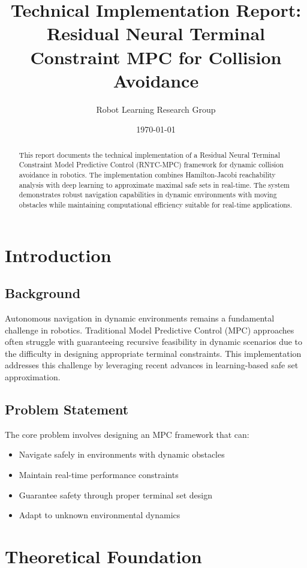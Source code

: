 \documentclass[12pt,a4paper]{article}
\title{Technical Implementation Report: \\ Residual Neural Terminal Constraint MPC for Collision Avoidance}
\author{Robot Learning Research Group}
\date{\today}
\begin{document}
\maketitle

\begin{abstract}
This report documents the technical implementation of a Residual Neural Terminal Constraint Model Predictive Control (RNTC-MPC) framework for dynamic collision avoidance in robotics. The implementation combines Hamilton-Jacobi reachability analysis with deep learning to approximate maximal safe sets in real-time. The system demonstrates robust navigation capabilities in dynamic environments with moving obstacles while maintaining computational efficiency suitable for real-time applications.
\end{abstract}

\tableofcontents

\section{Introduction}

\subsection{Background}
Autonomous navigation in dynamic environments remains a fundamental challenge in robotics. Traditional Model Predictive Control (MPC) approaches often struggle with guaranteeing recursive feasibility in dynamic scenarios due to the difficulty in designing appropriate terminal constraints. This implementation addresses this challenge by leveraging recent advances in learning-based safe set approximation.

\subsection{Problem Statement}
The core problem involves designing an MPC framework that can:
\begin{itemize}
    \item Navigate safely in environments with dynamic obstacles
    \item Maintain real-time performance constraints
    \item Guarantee safety through proper terminal set design
    \item Adapt to unknown environmental dynamics
\end{itemize}

\section{Theoretical Foundation}
\end{document}
